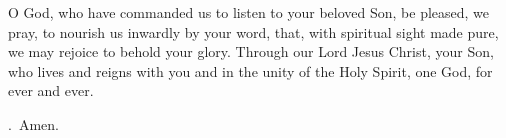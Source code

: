 \lettrine[lines=3]{O}{} God, who have commanded us
to listen to your beloved Son,
be pleased, we pray,
to nourish us inwardly by your word,
that, with spiritual sight made pure,
we may rejoice to behold your glory.
Through our Lord Jesus Christ, your Son,
who lives and reigns with you and in the unity of the Holy Spirit,
one God, for ever and ever. \par \Rbar.~Amen.
